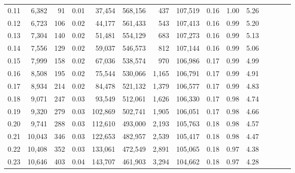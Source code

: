\begin{tabular}{rrrcrrrrrrrrrrr}
0.11 &   6,382 &     91 &                                       0.01 &   37,454 &  568,156 &      437 &  107,519 &  0.16 &  1.00 &                         5.26 \\
0.12 &   6,723 &    106 &                                       0.02 &   44,177 &  561,433 &      543 &  107,413 &  0.16 &  0.99 &                         5.20 \\
0.13 &   7,304 &    140 &                                       0.02 &   51,481 &  554,129 &      683 &  107,273 &  0.16 &  0.99 &                         5.13 \\
0.14 &   7,556 &    129 &                                       0.02 &   59,037 &  546,573 &      812 &  107,144 &  0.16 &  0.99 &                         5.06 \\
0.15 &   7,999 &    158 &                                       0.02 &   67,036 &  538,574 &      970 &  106,986 &  0.17 &  0.99 &                         4.99 \\
0.16 &   8,508 &    195 &                                       0.02 &   75,544 &  530,066 &    1,165 &  106,791 &  0.17 &  0.99 &                         4.91 \\
0.17 &   8,934 &    214 &                                       0.02 &   84,478 &  521,132 &    1,379 &  106,577 &  0.17 &  0.99 &                         4.83 \\
0.18 &   9,071 &    247 &                                       0.03 &   93,549 &  512,061 &    1,626 &  106,330 &  0.17 &  0.98 &                         4.74 \\
0.19 &   9,320 &    279 &                                       0.03 &  102,869 &  502,741 &    1,905 &  106,051 &  0.17 &  0.98 &                         4.66 \\
0.20 &   9,741 &    288 &                                       0.03 &  112,610 &  493,000 &    2,193 &  105,763 &  0.18 &  0.98 &                         4.57 \\
0.21 &  10,043 &    346 &                                       0.03 &  122,653 &  482,957 &    2,539 &  105,417 &  0.18 &  0.98 &                         4.47 \\
0.22 &  10,408 &    352 &                                       0.03 &  133,061 &  472,549 &    2,891 &  105,065 &  0.18 &  0.97 &                         4.38 \\
0.23 &  10,646 &    403 &                                       0.04 &  143,707 &  461,903 &    3,294 &  104,662 &  0.18 &  0.97 &                         4.28 \\

\end{tabular}
